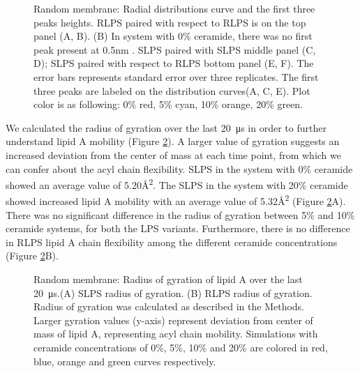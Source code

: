 \documentclass[10pt, letterpaper]{article}
\begin{document}
\begin{figure}[H]
  \centering
  \qquad
  \qquad
  \caption[Random Membrane: Radial Distribution Function]{Random membrane: Radial distributions curve and the first three peaks heights. RLPS paired with respect to RLPS is on the top panel (A, B). (B) In system with 0\% ceramide, there was no first peak present at 0.5nm . SLPS paired with SLPS middle panel (C, D); SLPS paired with respect to RLPS bottom panel (E, F). The error bars represents standard error over three replicates. The first three peaks are labeled on the distribution curves(A, C, E). Plot color is as following: 0\% red, 5\% cyan, 10\% orange, 20\% green.}
  \label{fig:rand_radial_dist}
\end{figure}
\newpage
We calculated the radius of gyration  over the last \SI{20}{\micro\second} in order to further understand lipid A mobility (Figure \ref{fig:ran_rgry}). A larger value of gyration suggests an increased deviation from the center of mass at each time point, from which we can confer about the acyl chain flexibility. SLPS in the system with 0\% ceramide showed an average value of 5.20\si{\angstrom^2}. The SLPS in the system with 20\% ceramide showed increased lipid A mobility with an average value of 5.32\si{\angstrom^2} (Figure \ref{fig:ran_rgry}A). There was no significant difference in the radius of gyration between 5\% and 10\% ceramide systems, for both the LPS variants. Furthermore, there is no difference in RLPS lipid A chain flexibility among the different ceramide concentrations (Figure \ref{fig:ran_rgry}B). 


\begin{figure}[H]
  \centering
  \caption[Random Membrane: Radius of gyration]{Random membrane: Radius of gyration of lipid A over the last \SI{20}{\micro\second}.(A) SLPS radius of gyration. (B) RLPS radius of gyration. Radius of gyration was calculated as described in the Methods. Larger gyration values (y-axis) represent deviation from center of mass of lipid A, representing acyl chain mobility. Simulations with ceramide concentrations of 0\%, 5\%, 10\% and 20\% are colored in red, blue, orange and green curves respectively.
  }\label{fig:ran_rgry}
\end{figure}
\end{document}
